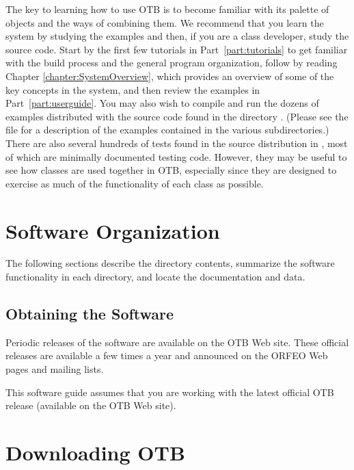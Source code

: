 The key to learning how to use OTB is to become familiar with its
palette of objects and the ways of combining them. We recommend that you learn
the system by studying the
examples and then, if you are a class developer, study the source
code. Start by the first few tutorials in Part~\ref{part:tutorials} to get
familiar with the build process and the general program organization, follow by
reading Chapter \ref{chapter:SystemOverview}, which provides an overview of some
of the key concepts in the system, and then review the examples in
Part~\ref{part:userguide}. You may also wish to compile and run the dozens of
examples
distributed with the source code found in the directory
. (Please see the file
 for a description of the examples
contained in the various subdirectories.) There are also several
hundreds of tests found in the source distribution in
, most of which are minimally documented
testing code. However, they may be useful to see how classes are used
together in OTB, especially since they are designed to exercise as
much of the functionality of each class as possible.

\section{Software Organization}
\label{sec:SoftwareOrganization}

The following sections describe the directory contents, summarize the
software functionality in each directory, and locate the documentation and
data.

\subsection{Obtaining the Software}
\label{sec:ObtainingTheSoftware}

Periodic releases of the software are available on the OTB Web
site. These official releases are available a few times a year and
announced on the ORFEO Web pages and mailing lists.

This software guide assumes that you are working with the latest official OTB
release (available on the OTB Web site). %

\section{Downloading OTB}
\label{sec:DownloadingOTB}

